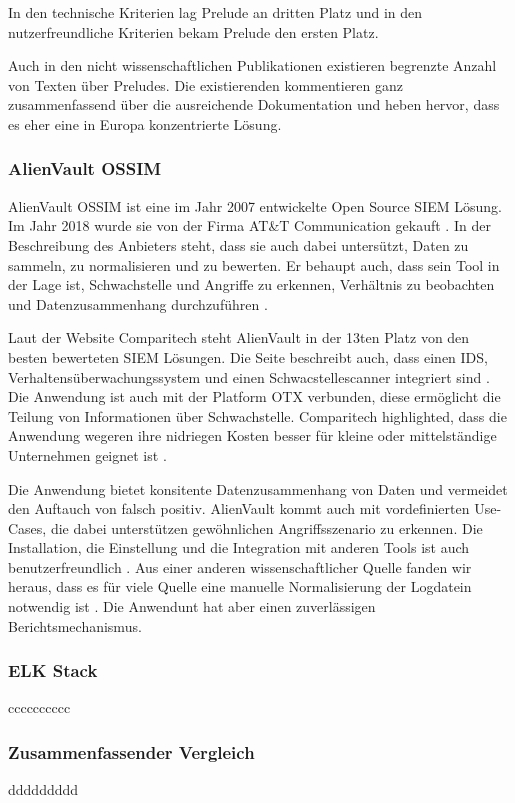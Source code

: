 In den technische Kriterien lag Prelude an dritten Platz und in den nutzerfreundliche Kriterien bekam Prelude den ersten Platz. 

Auch in den nicht wissenschaftlichen Publikationen existieren begrenzte Anzahl von Texten über Preludes. Die existierenden kommentieren ganz zusammenfassend über die ausreichende Dokumentation und heben hervor, dass es eher eine in Europa konzentrierte Lösung.

\subsubsection{AlienVault OSSIM}
AlienVault OSSIM ist eine im Jahr 2007 entwickelte \gls{Open Source} SIEM Lösung. Im Jahr 2018 wurde sie von der Firma AT\&T Communication gekauft \citep{CBN_AV}. In der Beschreibung des Anbieters steht, dass sie auch dabei untersützt, Daten zu sammeln, zu normalisieren und zu bewerten. Er behaupt auch, dass sein Tool in der Lage ist, Schwachstelle und Angriffe zu erkennen, Verhältnis zu beobachten und Datenzusammenhang durchzuführen \citep{ATT_AVO}.

Laut der Website Comparitech steht AlienVault in der 13ten Platz von den besten bewerteten \gls{SIEM} Lösungen. Die Seite beschreibt auch, dass einen \gls{IDS}, Verhaltensüberwachungssystem und einen Schwacstellescanner integriert sind . Die Anwendung ist auch mit der Platform \gls{OTX} verbunden, diese ermöglicht die Teilung von Informationen über Schwachstelle. Comparitech highlighted, dass die Anwendung wegeren ihre nidriegen Kosten besser für kleine oder mittelständige Unternehmen geignet ist \citep{comparitech_SIEM}. 

Die Anwendung bietet konsitente Datenzusammenhang von Daten und vermeidet den Auftauch von \gls{falsch positiv}. AlienVault kommt auch mit vordefinierten Use-Cases, die dabei unterstützen gewöhnlichen Angriffsszenario zu erkennen. Die Installation, die Einstellung und die Integration mit anderen Tools ist auch benutzerfreundlich \citep{Gomes_AV}. Aus einer anderen wissenschaftlicher Quelle fanden wir heraus, dass es für viele  Quelle eine manuelle Normalisierung der Logdatein notwendig ist \cite{Nabil_AV}. Die Anwendunt hat aber einen zuverlässigen Berichtsmechanismus.

\subsubsection{ELK Stack}
cccccccccc

\subsubsection{Zusammenfassender Vergleich}
ddddddddd

